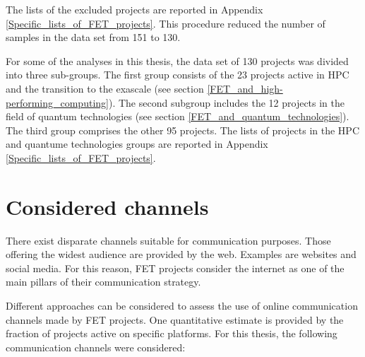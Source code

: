 The lists of the excluded projects are reported in Appendix \ref{Specific_lists_of_FET_projects}. This procedure reduced the number of samples in the data set from 151 to 130.

For some of the analyses in this thesis, the data set of 130 projects was divided into three sub-groups.  The first group consists of the 23 projects active in HPC and the transition to the exascale (see section \ref{FET_and_high-performing_computing}). The second subgroup includes the 12 projects in the field of quantum technologies (see section \ref{FET_and_quantum_technologies}). The third group comprises the other 95 projects. The lists of projects in the HPC and quantume technologies groups are reported in Appendix \ref{Specific_lists_of_FET_projects}. 

\section{Considered channels} \label{Considered_channels}
There exist disparate channels suitable for communication purposes. Those offering the widest audience are provided by the web. Examples are websites and social media. For this reason, FET projects consider the internet as one of the main pillars of their communication strategy.

Different approaches can be considered to assess the use of online communication channels made by FET projects. One quantitative estimate is provided by the fraction of projects active on specific platforms. For this thesis, the following communication channels were considered:   

